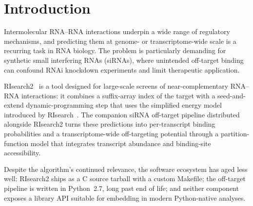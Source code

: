 \section{Introduction}

Intermolecular RNA--RNA interactions underpin a wide range of regulatory mechanisms, and predicting them at genome- or transcriptome-wide scale is a recurring task in RNA biology.
The problem is particularly demanding for synthetic small interfering RNAs (siRNAs), where unintended off-target binding can confound RNAi knockdown experiments and limit therapeutic application.

RIsearch2~\citep{alkan2017risearch2} is a tool designed for large-scale screens of near-complementary RNA--RNA interactions: it combines a suffix-array index of the target with a seed-and-extend dynamic-programming step that uses the simplified energy model introduced by RIsearch~\citep{wenzel2012risearch}.
The companion siRNA off-target pipeline distributed alongside RIsearch2 turns these predictions into per-transcript binding probabilities and a transcriptome-wide off-targeting potential through a partition-function model that integrates transcript abundance and binding-site accessibility.

Despite the algorithm's continued relevance, the software ecosystem has aged less well: RIsearch2 ships as a C source tarball with a custom Makefile; the off-target pipeline is written in Python~2.7, long past end of life; and neither component exposes a library API suitable for embedding in modern Python-native analyses.

